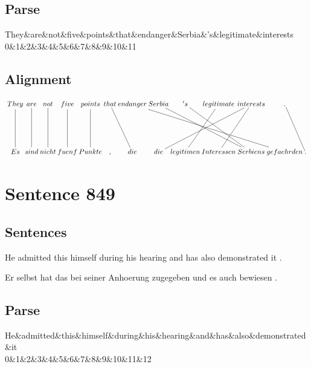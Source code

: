 \documentclass{report}
\begin{document}
\subsection*{Parse}
\begin{dependency}[theme=simple]
\begin{deptext}[column sep=.5cm, row sep=.1ex]
They\&are\&not\&five\&points\&that\&endanger\&Serbia\&'s\&legitimate\&interests\\
0\&1\&2\&3\&4\&5\&6\&7\&8\&9\&10\&11\\
\end{deptext}
\end{dependency}


\subsection*{Alignment}
\scriptsize{
$
\xymatrix@C-2.3pc{
They \ar @{-} [dd] & are \ar @{-} [dd] & not \ar @{-} [dd] & five \ar @{-} [dd] & points \ar @{-} [dd] & that \ar @{-} [ddr] & endanger \ar @{-} [ddrrrrr] & Serbia \ar @{-} [ddrrr] & 's \ar @{-} [ddrr] & legitimate \ar @{-} [ddl] & interests \ar @{-} [ddlll] \ar @{-} [ddl] & . \ar @{-} [ddr]\\\\
Es & sind & nicht & fuenf & Punkte & , & die & die & legitimen & Interessen & Serbiens & gefaehrden & .
}$}
\newpage\section*{Sentence 849}

\subsection*{Sentences}
He admitted this himself during his hearing and has also demonstrated it .

\noindent Er selbst hat das bei seiner Anhoerung zugegeben und es auch bewiesen .



\subsection*{Parse}
\begin{dependency}[theme=simple]
\begin{deptext}[column sep=.5cm, row sep=.1ex]
He\&admitted\&this\&himself\&during\&his\&hearing\&and\&has\&also\&demonstrated\&it\\
0\&1\&2\&3\&4\&5\&6\&7\&8\&9\&10\&11\&12\\
\end{deptext}
\end{dependency}
\end{document}
